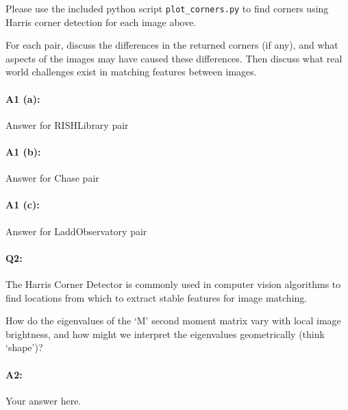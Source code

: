 Please use the included python script \texttt{plot\_corners.py} to find corners using Harris corner detection for each image above.

For each pair, discuss the differences in the returned corners (if any), and what aspects of the images may have caused these differences. Then discuss what real world challenges exist in matching features between images.


\paragraph{A1 (a):} Answer for RISHLibrary pair






\pagebreak
\paragraph{A1 (b):} Answer for Chase pair






\pagebreak
\paragraph{A1 (c):} Answer for LaddObservatory pair








\pagebreak
\paragraph{Q2:}
The Harris Corner Detector is commonly used in computer vision algorithms to find locations from which to extract stable features for image matching.

How do the eigenvalues of the `M' second moment matrix vary with local image brightness, and how might we interpret the eigenvalues geometrically (think `shape')?

\paragraph{A2:} Your answer here.






